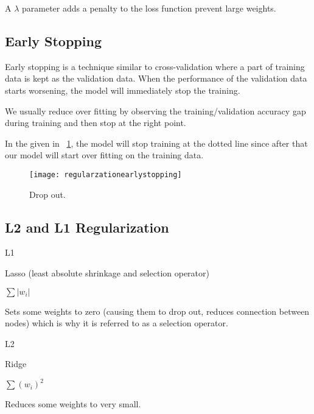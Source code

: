 A $\lambda$ parameter adds a penalty to the loss function prevent large weights.

	\subsection{Early Stopping}
	\begin{bulletedlist}
		\item Early stopping is a technique similar to cross-validation where a part of training data is kept as the validation data. When the performance of the validation data starts worsening, the model will immediately stop the training.
		\item We usually reduce over fitting by observing the training/validation accuracy gap during training and then stop at the right point.
		\item In the given in \figurename~\ref{fig:regularzationearlystopping}, the model will stop training at the dotted line since after that our model will start over fitting on the training data.
	\end{bulletedlist}

 	\begin{figure}[h]
		\centering
		\texttt{[image: regularzationearlystopping]}
		\caption{Drop out.}
		\label{fig:regularzationearlystopping}
	\end{figure}

	\subsection{L2 and L1 Regularization}
	\begin{plainlist}
		\item L1
		\begin{bulletedlist}
			\item Lasso (least absolute shrinkage and selection operator)
			\item $\sum \left| w_i \right|$
			\item Sets some weights to zero (causing them to drop out, reduces connection between nodes) which is why it is referred to as a selection operator.
		\end{bulletedlist}
		\item L2
		\begin{bulletedlist}
			\item Ridge
			\item $\sum \left( w_i \right)^2$
			\item Reduces some weights to very small.
		\end{bulletedlist}
	\end{plainlist}

